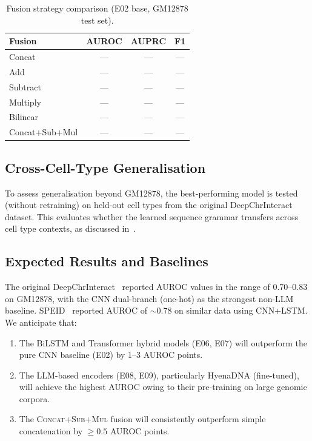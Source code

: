 \begin{table}[H]
\centering
\caption{Fusion strategy comparison (E02 base, GM12878 test set).}
\label{tab:fusion_abl}
\begin{tabular}{lccc}
\toprule
Fusion & AUROC & AUPRC & F1 \\
\midrule
Concat        & --- & --- & --- \\
Add           & --- & --- & --- \\
Subtract      & --- & --- & --- \\
Multiply      & --- & --- & --- \\
Bilinear      & --- & --- & --- \\
Concat+Sub+Mul & --- & --- & --- \\
\bottomrule
\end{tabular}
\end{table}

\subsection{Cross-Cell-Type Generalisation}

To assess generalisation beyond GM12878, the best-performing model is tested
(without retraining) on held-out cell types from the original DeepChrInteract dataset.
This evaluates whether the learned sequence grammar transfers across cell type contexts,
as discussed in~\cite{speid}.

\subsection{Expected Results and Baselines}

The original DeepChrInteract~\cite{deepchrinteract_doc} reported AUROC values in the
range of 0.70--0.83 on GM12878, with the CNN dual-branch (one-hot) as the strongest
non-LLM baseline.
SPEID~\cite{speid} reported AUROC of $\sim$0.78 on similar data using CNN+LSTM.
We anticipate that:
\begin{enumerate}[noitemsep]
  \item The BiLSTM and Transformer hybrid models (E06, E07) will outperform the
        pure CNN baseline (E02) by 1--3 AUROC points.
  \item The LLM-based encoders (E08, E09), particularly HyenaDNA (fine-tuned),
        will achieve the highest AUROC owing to their pre-training on large
        genomic corpora.
  \item The \textsc{Concat+Sub+Mul} fusion will consistently outperform simple
        concatenation by $\geq 0.5$ AUROC points.
\end{enumerate}
